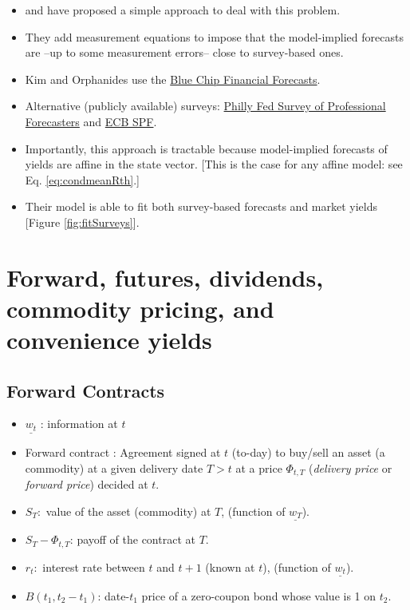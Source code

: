 \documentclass[
  12pt,
]{book}
\providecommand{\tightlist}{%
  \setlength{\itemsep}{0pt}\setlength{\parskip}{0pt}}
\theoremstyle{definition}
\theoremstyle{definition}
\theoremstyle{definition}
\theoremstyle{definition}
\theoremstyle{remark}
\begin{document}
\begin{itemize}
\tightlist
\item
  \citet{Kim_Orphanides_2005} and \citet{Kim_Orphanides_2005} have proposed a simple approach to deal with this problem.
\item
  They add measurement equations to impose that the model-implied forecasts are --up to some measurement errors-- close to survey-based ones.
\item
  Kim and Orphanides use the \href{https://lrus.wolterskluwer.com/store/products/blue-chip-financial-forecasts-prod-ss07418345/paperback-item-1-ss07418345}{Blue Chip Financial Forecasts}.
\item
  Alternative (publicly available) surveys: \href{https://www.philadelphiafed.org/research-and-data/real-time-center/survey-of-professional-forecasters}{Philly Fed Survey of Professional Forecasters} and \href{https://www.ecb.europa.eu/stats/ecb_surveys/survey_of_professional_forecasters/html/index.en.html}{ECB SPF}.
\item
  Importantly, this approach is tractable because model-implied forecasts of yields are affine in the state vector. {[}This is the case for any affine model: see Eq. \eqref{eq:condmeanRth}.{]}
\item
  Their model is able to fit both survey-based forecasts and market yields {[}Figure \ref{fig:fitSurveys}{]}.
\end{itemize}

\hypertarget{forward-futures-dividends-commodity-pricing-and-convenience-yields}{%
\chapter{Forward, futures, dividends, commodity pricing, and convenience yields}\label{forward-futures-dividends-commodity-pricing-and-convenience-yields}}

\hypertarget{FCFPForwards}{%
\section{Forward Contracts}\label{FCFPForwards}}

\begin{itemize}
\tightlist
\item
  \(\underline{w_{t}}\) : information at \(t\)
\item
  Forward contract : Agreement signed at \(t\) (to-day) to buy/sell an asset (a commodity) at a given delivery date \(T>t\) at a price \(\Phi_{t,T}\) (\emph{delivery price} or \emph{forward price}) decided at \(t\).
\item
  \(S_T :\) value of the asset (commodity) at \(T\), (function of \(\underline{w_{T}}\)).
\item
  \(S_T - \Phi_{t,T}\): payoff of the contract at \(T\).
\item
  \(r_t :\) interest rate between \(t\) and \(t+1\) (known at \(t\)), (function of \(\underline{w_{t}}\)).
\item
  \(B(t_1,t_2-t_1)\): date-\(t_1\) price of a zero-coupon bond whose value is 1 on \(t_2\).
\end{itemize}
\end{document}
